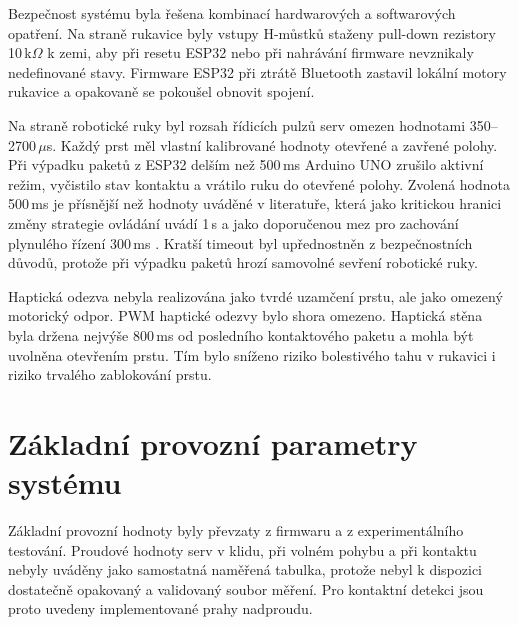 \documentclass[FZS,DP]{tulthesis}
\begin{document}
Bezpečnost systému byla řešena kombinací hardwarových a softwarových opatření. Na straně rukavice byly vstupy H-můstků staženy pull-down rezistory 10\,k$\Omega$ k zemi, aby při resetu ESP32 nebo při nahrávání firmware nevznikaly nedefinované stavy. Firmware ESP32 při ztrátě Bluetooth zastavil lokální motory rukavice a opakovaně se pokoušel obnovit spojení.

Na straně robotické ruky byl rozsah řídicích pulzů serv omezen hodnotami 350--2700\,$\mu$s. Každý prst měl vlastní kalibrované hodnoty otevřené a zavřené polohy. Při výpadku paketů z ESP32 delším než 500\,ms Arduino UNO zrušilo aktivní režim, vyčistilo stav kontaktu a vrátilo ruku do otevřené polohy. Zvolená hodnota 500\,ms je přísnější než hodnoty uváděné v literatuře, která jako kritickou hranici změny strategie ovládání uvádí 1\,s a jako doporučenou mez pro zachování plynulého řízení 300\,ms \cite{Bolarinwa2022,Almeida202098}. Kratší timeout byl upřednostněn z bezpečnostních důvodů, protože při výpadku paketů hrozí samovolné sevření robotické ruky.

Haptická odezva nebyla realizována jako tvrdé uzamčení prstu, ale jako omezený motorický odpor. PWM haptické odezvy bylo shora omezeno. Haptická stěna byla držena nejvýše 800\,ms od posledního kontaktového paketu a mohla být uvolněna otevřením prstu. Tím bylo sníženo riziko bolestivého tahu v rukavici i riziko trvalého zablokování prstu.

\section{Základní provozní parametry systému}
\label{sec:provozni-hodnoty}

Základní provozní hodnoty byly převzaty z firmwaru a z experimentálního testování. Proudové hodnoty serv v klidu, při volném pohybu a při kontaktu nebyly uváděny jako samostatná naměřená tabulka, protože nebyl k dispozici dostatečně opakovaný a validovaný soubor měření. Pro kontaktní detekci jsou proto uvedeny implementované prahy nadproudu.
\end{document}
